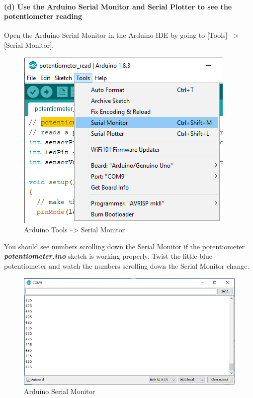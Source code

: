     \hypertarget{d-use-the-arduino-serial-monitor-and-serial-plotter-to-see-the-potentiometer-reading}{%
\paragraph{(d) Use the Arduino Serial Monitor and Serial Plotter to see
the potentiometer
reading}\label{d-use-the-arduino-serial-monitor-and-serial-plotter-to-see-the-potentiometer-reading}}

Open the Arduino Serial Monitor in the Arduino IDE by going to
{[}Tools{]} --\textgreater{} {[}Serial Monitor{]}.

\begin{figure}[h!]
\centering
\includegraphics{images/Tools_SerialMonitor.png}
\caption{Arduino Tools --\textgreater{} Serial Monitor}
\end{figure}

You should see numbers scrolling down the Serial Monitor if the
potentiometer \textbf{\emph{potentiometer.ino}} sketch is working
properly. Twist the little blue potentiometer and watch the numbers
scrolling down the Serial Monitor change.

\begin{figure}[h!]
\centering
\includegraphics{images/serial_monitor_output.png}
\caption{Arduino Serial Monitor}
\end{figure}

